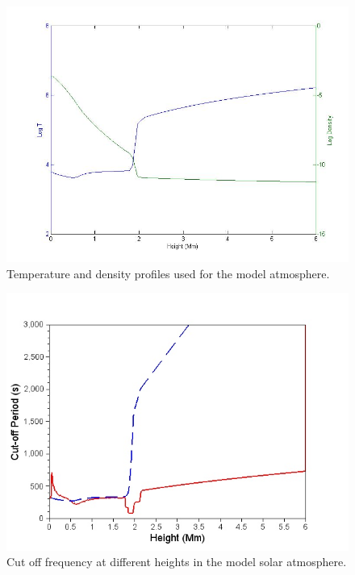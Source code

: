 \documentclass[authoryear,final,1p]{elsarticle}
\begin{document}

\begin{figure}[h]
\includegraphics[scale=0.5]{images/VAL3C_rho_temp_fig2.jpg}
\caption{Temperature and density profiles used for the model atmosphere. }
\end{figure}




\begin{figure}[h]\label{cutofffrequency_fig4}
\includegraphics[scale=0.7]{images/cutofffrequency_fig4.jpg}
\caption{Cut off frequency at different heights in the model  solar atmosphere. }
\end{figure}
\end{document}
